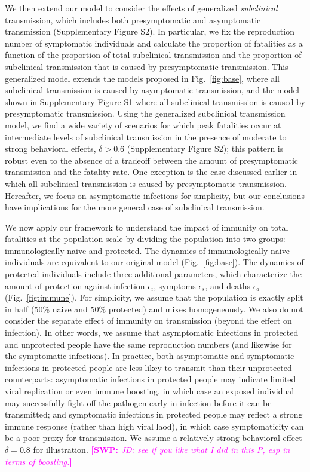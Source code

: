 \documentclass[12pt]{article}
\newcommand{\comment}{\showcomment}
\newcommand{\showcomment}[3]{\textcolor{#1}{\textbf{[#2: }\textsl{#3}\textbf{]}}}
\newcommand{\swp}[1]{\comment{magenta}{SWP}{#1}}
\newcommand{\fref}[1]{Fig.~\ref{fig:#1}}
\begin{document}
We then extend our model to consider the effects of generalized \textit{subclinical} transmission, which includes both presymptomatic and asymptomatic transmission (Supplementary Figure S2).
In particular, we fix the reproduction number of symptomatic individuals and calculate the proportion of fatalities as a function of the proportion of total subclinical transmission and the proportion of subclinical transmission that is caused by presymptomatic transmission.
This generalized model extends the models proposed in \fref{base}, where all subclinical transmission is caused by asymptomatic transmission, and the model shown in Supplementary Figure S1 where all subclinical transmission is caused by presymptomatic transmission.
Using the generalized subclinical transmission model, we find a wide variety of scenarios for which peak fatalities occur at intermediate levels of subclinical transmission in the presence of moderate to strong behavioral effects, $\delta > 0.6$ (Supplementary Figure S2);
this pattern is robust even to the absence of a tradeoff between the amount of presymptomatic transmission and the fatality rate.
One exception is the case discussed earlier in which all subclinical transmission is caused by presymptomatic transmission.
Hereafter, we focus on asymptomatic infections for simplicity, but our conclusions have implications for the more general case of subclinical transmission.

We now apply our framework to understand the impact of immunity on total fatalities at the population scale by dividing the population into two groups: immunologically naive and protected.
The dynamics of immunologically naive individuals are equivalent to our original model (\fref{base}).
The dynamics of protected individuals include three additional parameters, which characterize the amount of protection against infection $\epsilon_i$, symptoms $\epsilon_s$, and deaths $\epsilon_d$ (\fref{immune}).
For simplicity, we assume that the population is exactly split in half (50\% naive and 50\% protected) and mixes homogeneously. We also do not consider the separate effect of immunity on transmission (beyond the effect on infection). 
In other words, we assume that asymptomatic infections in protected and unprotected people have the same reproduction numbers (and likewise for the symptomatic infections).
In practice, both asymptomatic and symptomatic infections in protected people are less likey to transmit than their unprotected counterparts: asymptomatic infections in protected people may indicate limited viral replication or even immune boosting, in which case an exposed individual may successfully fight off the pathogen early in infection before it can be transmitted; and symptomatic infections in protected people may reflect a strong immune response (rather than high viral laod), in which case symptomaticity can be a poor proxy for transmission.
We assume a relatively strong behavioral effect $\delta=0.8$ for illustration.
\swp{JD: see if you like what I did in this P, esp in terms of boosting.}
\end{document}
